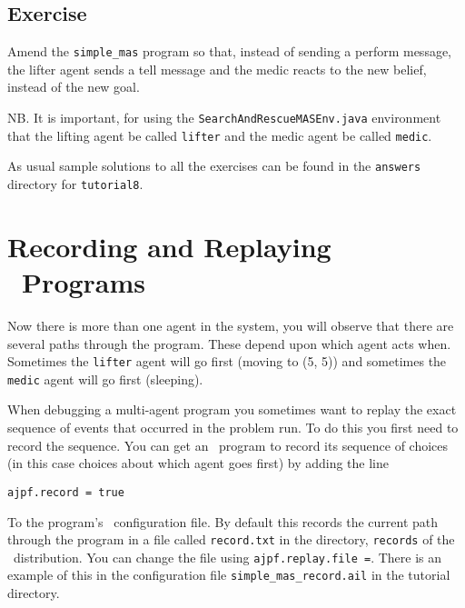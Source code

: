 \subsection{Exercise}
Amend the \texttt{simple\_mas} program so that, instead of sending a perform message, the lifter agent sends a tell message and the medic reacts to the new belief, instead of the new goal.

NB. It is important, for using the \texttt{SearchAndRescueMASEnv.java} environment that the lifting agent be called \texttt{lifter} and the medic agent be called \texttt{medic}.

As usual sample solutions to all the exercises can be found in the \texttt{answers} directory for \texttt{tutorial8}.

\section{Recording and Replaying \ail\ Programs}
Now there is more than one agent in the system, you will observe that there are several paths through the program.  These depend upon which agent acts when.  Sometimes the \texttt{lifter} agent will go first (moving to (5, 5)) and sometimes the \texttt{medic} agent will go first (sleeping).

When debugging a multi-agent program you sometimes want to replay the exact sequence of events that occurred in the  problem run.  To do this you first need to record the sequence.  You can get an \ail\ program to record its sequence of choices (in this case choices about which agent goes first) by adding the line

\begin{verbatim}
ajpf.record = true
\end{verbatim}

To the program's \ail\ configuration file.  By default this records the current path through the program in a file called \texttt{record.txt} in the directory, \texttt{records} of the \mcapl\ distribution.  You can change the file using \texttt{ajpf.replay.file =}.  There is an example of this in the configuration file \texttt{simple\_mas\_record.ail} in the tutorial directory.

